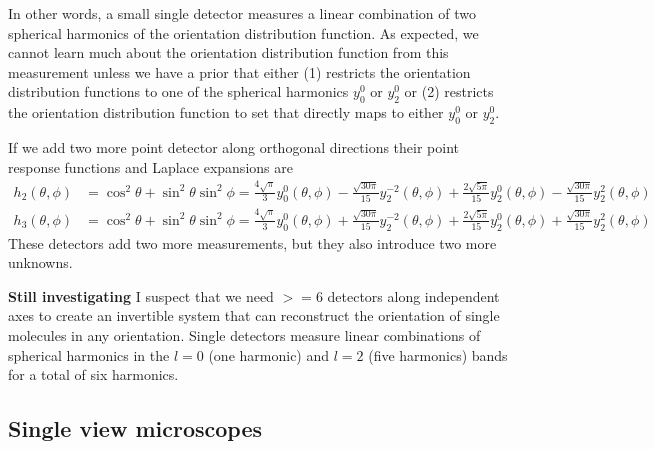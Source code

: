 \documentclass[10pt]{article}
\begin{document}
In other words, a small single detector measures a linear combination of two
spherical harmonics of the orientation distribution function. As expected, we
cannot learn much about the orientation distribution function from this
measurement unless we have a prior that either (1) restricts the orientation
distribution functions to one of the spherical harmonics $y_0^0$ or $y_2^0$ or
(2) restricts the orientation distribution function to set that directly maps to
either $y_0^0$ or $y_2^0$.

If we add two more point detector along orthogonal directions their point response
functions and Laplace expansions are
\begin{align}
  h_2(\theta, \phi) &= \cos^2\theta + \sin^2\theta\sin^2\phi = \frac{4\sqrt{\pi}}{3}y_0^0(\theta, \phi) - \frac{\sqrt{30\pi}}{15}y_2^{-2}(\theta, \phi) + \frac{2\sqrt{5\pi}}{15}y_2^{0}(\theta, \phi) - \frac{\sqrt{30\pi}}{15}y_2^2(\theta, \phi)\\
  h_3(\theta, \phi) &= \cos^2\theta + \sin^2\theta\sin^2\phi = \frac{4\sqrt{\pi}}{3}y_0^0(\theta, \phi) + \frac{\sqrt{30\pi}}{15}y_2^{-2}(\theta, \phi) + \frac{2\sqrt{5\pi}}{15}y_2^{0}(\theta, \phi) + \frac{\sqrt{30\pi}}{15}y_2^2(\theta, \phi)
\end{align}
These detectors add two more measurements, but they also introduce two more
unknowns.

\textbf{Still investigating} I suspect that we need $>=6$ detectors along
independent axes to create an invertible system that can reconstruct the
orientation of single molecules in any orientation. Single detectors measure
linear combinations of spherical harmonics in the $l=0$ (one harmonic) and $l=2$
(five harmonics) bands for a total of six harmonics.

\subsection{Single view microscopes}
\end{document}
